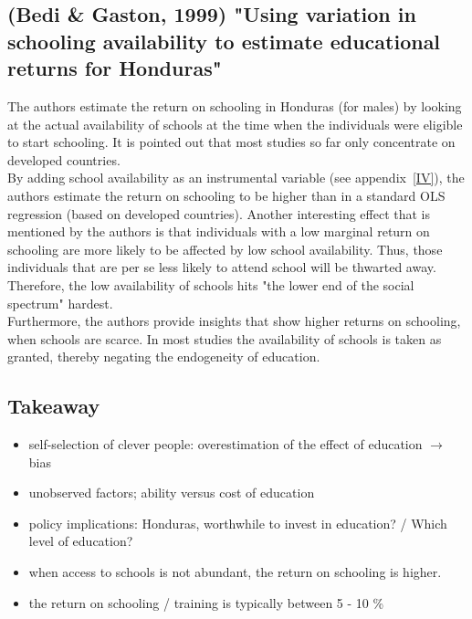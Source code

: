 \documentclass[12pt,a4paper]{article}
\begin{document}
  \subsection{(Bedi \& Gaston, 1999) "Using variation in schooling availability to estimate educational returns for Honduras"} %
  \label{sub:bedi}
  The authors estimate the return on schooling in Honduras (for males) by looking at the actual availability of schools at the
  time when the individuals were eligible to start schooling. It is pointed out that most studies so far only concentrate
  on developed countries.\\
  By adding school availability as an instrumental variable (see appendix~\ref{IV}), the authors estimate the return
  on schooling to be higher than in a standard OLS regression (based on developed countries). Another interesting effect
  that is mentioned by the authors is that individuals with a low marginal return on schooling are more likely to
  be affected by low school availability. Thus, those individuals that are per se less likely to attend school will
  be thwarted away. Therefore, the low availability of schools hits "the lower end of the social spectrum" hardest.\\
  Furthermore, the authors provide insights that show higher returns on schooling, when schools are scarce. In most
  studies the availability of schools is taken as granted, thereby negating the endogeneity of education.\\
  
  \subsection{Takeaway} %
    \begin{itemize}
      \item self-selection of clever people: overestimation of the effect of education $\rightarrow$
        bias
      \item unobserved factors; ability versus cost of education
      \item policy implications: Honduras, worthwhile to invest in education? / Which level of
        education?
      \item when access to schools is not abundant, the return on schooling is higher.
      \item the return on schooling / training is typically between 5 - 10 \%
    \end{itemize}
  
\end{document}
